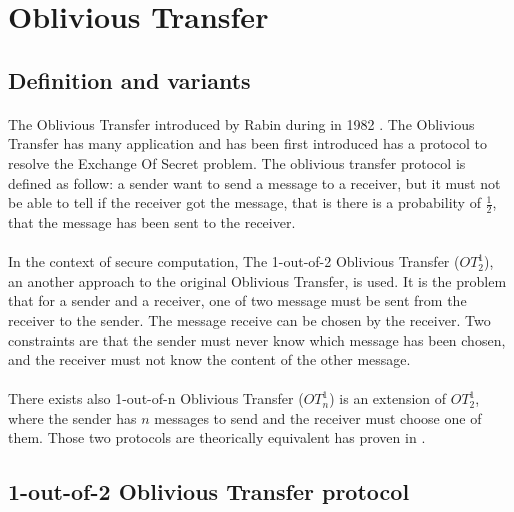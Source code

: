 \documentclass[11pt,a4paper]{article}
\begin{document}
\section{Oblivious Transfer}

\subsection{Definition and variants}

\paragraph{}


The Oblivious Transfer introduced by Rabin during
in 1982 \cite{rabin_how_nodate}. The Oblivious Transfer has many application
and has been first introduced has a protocol to resolve the Exchange Of
Secret problem.
The oblivious transfer protocol is defined as follow:
a sender want to send a message to a receiver, but it
must not be able to tell if the receiver got the message, that
is there is a probability of $\frac{1}{2}$, that the message
has been sent to the receiver.

\paragraph{}


In the context of secure computation,
The 1-out-of-2 Oblivious Transfer ($OT^1_2$),
an another approach to the original Oblivious Transfer, is used.
It is the problem
that for a sender and a receiver, one of two message must be sent
from the receiver to the sender. The message receive can be chosen
by the receiver. Two constraints are that the sender must never know
which message has been chosen, and the receiver must not know
the content of the other message.

\paragraph{}


There exists also
1-out-of-n Oblivious Transfer ($OT^1_n$) is an extension of $OT^1_2$,
where the sender has $n$ messages to send and the receiver must choose
one of them. Those two protocols are theorically equivalent
has proven in \cite{goos_equivalence_1988, goos_foundations_1998}.


\subsection{1-out-of-2 Oblivious Transfer protocol}
\end{document}
